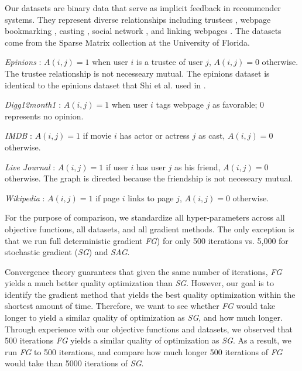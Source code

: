 Our datasets are binary data that serve as implicit feedback in recommender systems. 
They represent diverse relationships including trustees \cite{epinions}, webpage bookmarking \cite{digg12month1}, casting \cite{IMDB}, social network \cite{ljournal2008}, and linking webpages \cite{wikipedia20070206}.
The datasets come from the Sparse Matrix collection at the University of Florida.
\begin{sloppy}
\begin{compactenum}
\item \emph{Epinions} \cite{epinions}: $A(i,j) = 1$ when user $i$ is a trustee of user $j$, $A(i,j) = 0$ otherwise.  
The trustee relationship is not necesseary mutual.  The epinions dataset is identical to the epinions dataset that Shi et al. used in \cite{climf}. 
\item \emph{Digg12month1} \cite{digg12month1}: $A(i,j) = 1$ when user $i$ tags webpage $j$ as favorable; 0 represents no opinion. 
\item \emph{IMDB} \cite{IMDB}: $A(i,j) = 1 $ if movie $i$ has actor or actress $j$ as cast, $A(i,j) = 0$ otherwise. 
\item \emph{Live Journal} \cite{ljournal2008}:  $A(i,j) = 1 $ if user $i$ has user $j$ as his friend, $A(i,j) = 0$ otherwise. 
The graph is directed because the friendship is not neceseary mutual.
\item \emph{Wikipedia} \cite{wikipedia20070206}: $A(i,j) = 1$ if page $i$ links to page $j$, $A(i,j) = 0$ otherwise.  
\end{compactenum}
\end{sloppy}


For the purpose of comparison, we standardize all hyper-parameters across all objective functions, all datasets, and all gradient methods.
The only exception is that we run full deterministic gradient \emph{FG}) for only 500 iterations vs. 5,000 for stochastic gradient (\emph{SG}) and \emph{SAG}.

Convergence theory guarantees that given the same number of iterations, \emph{FG} yields a much better quality optimization than \emph{SG}.
However, our goal is to identify the gradient method that yields the best quality optimization within the shortest amount of time.
Therefore, we want to see whether \emph{FG} would take longer to yield a similar quality of optimization as \emph{SG}, and how much longer.
Through experience with our objective functions and datasets, we observed that 500 iterations \emph{FG} yields a similar quality of optimization as \emph{SG}.
As a result, we run \emph{FG} to 500 iterations, and compare how much longer 500 iterations of \emph{FG} would take than 5000 iterations of \emph{SG}.

